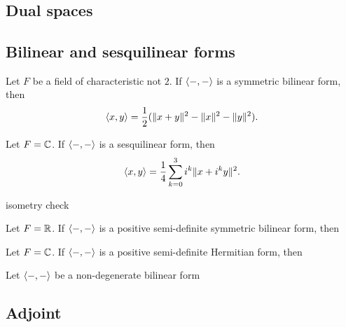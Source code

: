 \documentclass{../../large}
\begin{document}
\chapter{}
\section{Dual spaces}

\begin{prb}
\end{prb}

\section{Bilinear and sesquilinear forms}

\begin{prb}
\begin{parts}
\item Let $F$ be a field of characteristic not $2$. If $\langle-,-\rangle$ is a symmetric bilinear form, then
\[\langle x,y\rangle=\frac12(\|x+y\|^2-\|x\|^2-\|y\|^2).\]
\item Let $F=\mathbb{C}$. If $\langle-,-\rangle$ is a sesquilinear form, then
\[\langle x,y\rangle=\frac14\sum_{k=0}^3i^k\|x+i^ky\|^2.\]
\item isometry check
\end{parts}
\end{prb}

\begin{prb}
\begin{parts}
\item Let $F=\mathbb{R}$. If $\langle-,-\rangle$ is a positive semi-definite symmetric bilinear form, then
\item Let $F=\mathbb{C}$. If $\langle-,-\rangle$ is a positive semi-definite Hermitian form, then
\end{parts}
\end{prb}

\begin{prb}
Let $\langle-,-\rangle$ be a non-degenerate bilinear form
\end{prb}

\section{Adjoint}
\begin{prb}
\end{prb}
\end{document}
